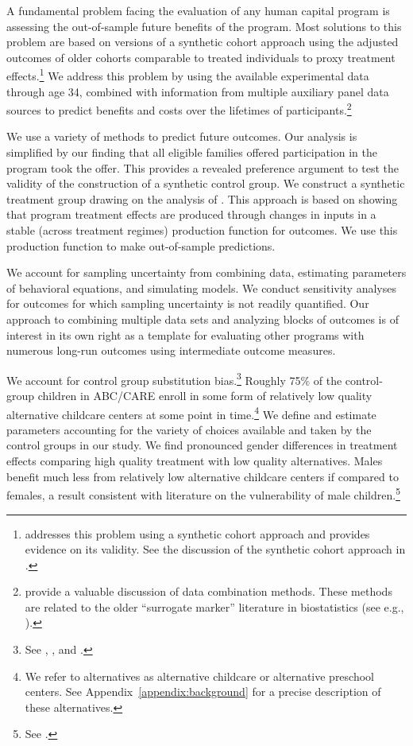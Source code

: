 A fundamental problem facing the evaluation of any human capital program is assessing the out-of-sample future benefits of the program. Most solutions to this problem are based on versions of a synthetic cohort approach using the adjusted outcomes of older cohorts comparable to treated individuals to proxy treatment effects.\footnote{\cite{Mincer_1974_schooling} addresses this problem using a synthetic cohort approach and provides evidence on its validity. See the discussion of the synthetic cohort approach in \cite{Heckman_Lochner_ea_2006_HEE}.} We address this problem by using the available experimental data through age 34, combined with information from multiple auxiliary panel data sources to predict benefits and costs over the lifetimes of participants.\footnote{\citet{Ridder_Moffitt_2007_hbk_metricsdata} provide a valuable discussion of data combination methods. These methods are related to the older ``surrogate marker'' literature in biostatistics (see e.g., \citealp{Prentice_1989_Surrogate_SiM}).}

We use a variety of methods to predict future outcomes. Our analysis is simplified by our finding that all eligible families offered participation in the program took the offer. This provides a revealed preference argument to test the validity of the construction of a synthetic control group. We construct a synthetic treatment group drawing on the analysis of \citet{Heckman_Pinto_etal_2013_PerryFactor}. This approach is based on showing that program treatment effects are produced through changes in inputs in a stable (across treatment regimes) production function for outcomes. We use this production function to make out-of-sample predictions.

We account for sampling uncertainty from combining data, estimating parameters of behavioral equations, and simulating models. We conduct sensitivity analyses for outcomes for which sampling uncertainty is not readily quantified. Our approach to combining multiple data sets and analyzing blocks of outcomes is of interest in its own right as a template for evaluating other programs with numerous long-run outcomes using intermediate outcome measures.

We account for control group substitution bias.\footnote{See \cite{Heckman_1992_randomization}, \cite{Heckman_Hohmann_etal_2000_QJE}, and \cite{Kline_Walters_2016_QJE}.} Roughly 75\% of the control-group children in ABC/CARE enroll in some form of relatively low quality alternative childcare centers at some point in time.\footnote{We refer to alternatives as alternative childcare or alternative preschool centers. See Appendix~\ref{appendix:background} for a precise description of these alternatives.} We define and estimate parameters accounting for the variety of choices available and taken by the control groups in our study. We find pronounced gender differences in treatment effects comparing high quality treatment with low quality alternatives. Males benefit much less from relatively low alternative childcare centers if compared to females, a result consistent with literature on the vulnerability of male children.\footnote{See \citet{Rutter_1972_Maternal-Deprivation,Kottelenberg-Lehrer_2014_Gender-Effects,Autor-etal_2015_Family-Disadvantage,Baker_Gruber_Milligan_2015_Noncog_Defects}.}

